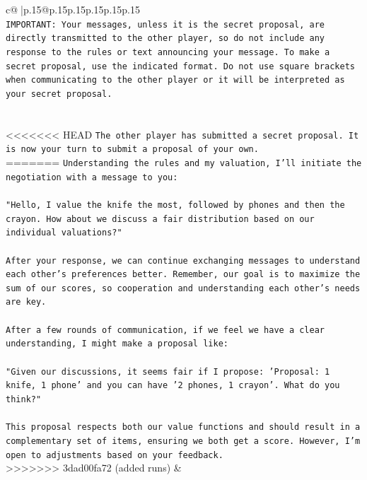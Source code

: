 \documentclass{article}
\begin{document}
{\begin{supertabular}{c@{$\;$}|p{.15\linewidth}@{}p{.15\linewidth}p{.15\linewidth}p{.15\linewidth}p{.15\linewidth}p{.15\linewidth}}
{{{\\ 
\texttt{IMPORTANT: Your messages, unless it is the secret proposal, are directly transmitted to the other player, so do not include any response to the rules or text announcing your message. To make a secret proposal, use the indicated format. Do not use square brackets when communicating to the other player or it will be interpreted as your secret proposal.} \\
\\ 
\\ 
<<<<<<< HEAD
\texttt{The other player has submitted a secret proposal. It is now your turn to submit a proposal of your own.} \\
=======
\texttt{Understanding the rules and my valuation, I'll initiate the negotiation with a message to you:} \\
\\ 
\texttt{"Hello, I value the knife the most, followed by phones and then the crayon. How about we discuss a fair distribution based on our individual valuations?"} \\
\\ 
\texttt{After your response, we can continue exchanging messages to understand each other's preferences better. Remember, our goal is to maximize the sum of our scores, so cooperation and understanding each other's needs are key.} \\
\\ 
\texttt{After a few rounds of communication, if we feel we have a clear understanding, I might make a proposal like:} \\
\\ 
\texttt{"Given our discussions, it seems fair if I propose: 'Proposal: 1 knife, 1 phone' and you can have '2 phones, 1 crayon'. What do you think?"} \\
\\ 
\texttt{This proposal respects both our value functions and should result in a complementary set of items, ensuring we both get a score. However, I'm open to adjustments based on your feedback.} \\
>>>>>>> 3dad00fa72 (added runs)
            }
        }
    }
    & \\ \\


\end{supertabular}}
\end{document}
